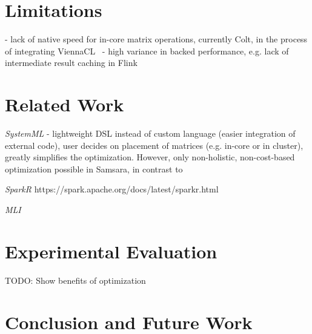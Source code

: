 \documentclass{article}
\begin{document}
\section{Limitations}

 - lack of native speed for in-core matrix operations, currently Colt, in the process of integrating ViennaCL~\cite{Tillet2013}
 - high variance in backed performance, e.g. lack of intermediate result caching in Flink

\section{Related Work}

{\em SystemML} \cite{Ghoting2011} - lightweight DSL instead of custom language (easier integration of external code), user decides on placement of matrices (e.g. in-core or in cluster), greatly simplifies the optimization. However, only non-holistic, non-cost-based optimization possible in Samsara, in contrast to~\cite{Boehm2014}

{\em SparkR} https://spark.apache.org/docs/latest/sparkr.html

{\em MLI} \cite{Sparks2013}

\section{Experimental Evaluation}

TODO: Show benefits of optimization

\section{Conclusion and Future Work}




\end{document}
